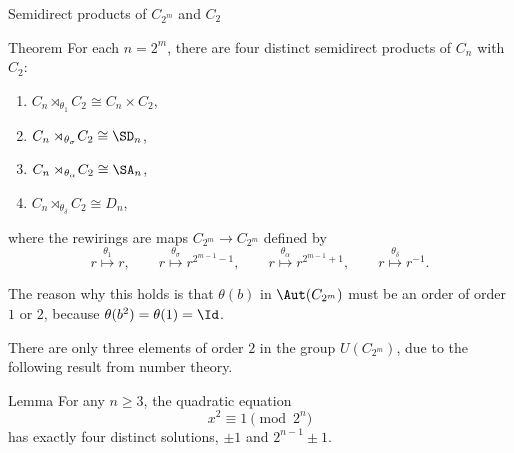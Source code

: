 \documentclass[8pt, handout]{beamer}
\newcommand{\Pause}{}
\begin{document}
\begin{frame}{Semidirect products of $C_{2^m}$ and $C_2$} \smallskip
  
  
  \begin{block}{Theorem}
    For each $n=2^m$, there are four distinct semidirect products of
    $C_n$ with $C_2$: \vspace{-3mm}
    \begin{multicols}{2}
      \begin{enumerate}
      \item $C_n\rtimes_{\theta_1}\!C_2\cong C_n\times C_2$,
      \item $C_n\rtimes_{\theta_\sigma}\!C_2\cong\SD_n$,
      \item $C_n\rtimes_{\theta_\alpha}\!C_2\cong\SA_n$,
      \item $C_n\rtimes_{\theta_\delta}\!C_2\cong D_n$,
      \end{enumerate}
    \end{multicols}
    \vspace{-1mm}
    where the rewirings are maps $C_{2^m}\to C_{2^m}$ defined by \vspace{-1mm}
    \[
    r\stackrel{\theta_1}{\longmapsto}r,\qquad
    r\stackrel{\theta_\sigma}{\longmapsto}r^{2^{m-1}-1},\qquad
    r\stackrel{\theta_\alpha}{\longmapsto}r^{2^{m-1}+1},\qquad
    r\stackrel{\theta_\delta}{\longmapsto}r^{-1}.
    \]
  \end{block}
  
  \smallskip\Pause
  
  
  The reason why this holds is that $\theta(b)$ in $\Aut(C_{2^m})$
  must be an order of order $1$ or $2$, because
  $\theta(b^2)=\theta(1)=\Id$. \medskip\Pause
  
  There are only three elements of order $2$ in the group
  $U(C_{2^m})$, due to the following result from number theory.
  
  \begin{exampleblock}{Lemma}
    For any $n\geq 3$, the quadratic equation
    \[
    x^2\equiv 1\pmod{2^n}
    \]
    has exactly four distinct solutions, $\pm 1$ and $2^{n-1}\pm 1$.
  \end{exampleblock}
  
\end{frame}

\end{document}
